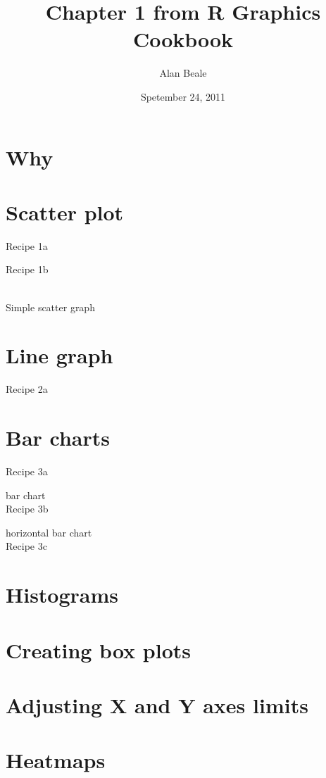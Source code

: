 \documentclass[10pt]{article}
\title{Chapter 1 from R Graphics Cookbook }
\author{Alan Beale}
\date{Spetember 24, 2011}
\newcommand{\placeRecipe}[1]{\bigskip \noindent  \bigskip}
\newcommand{\testRecipe}[1]{\begin{figure}[!htb] \centering  \end{figure}}
\begin{document}
\sffamily 
\maketitle

\section{Why}

\section{Scatter plot}
\Large{Recipe 1a}
\placeRecipe{recipe1a}

\Large{Recipe 1b}
\testRecipe{recipe1b}
\\Simple scatter graph 
\clearpage
\section{Line graph}
\Large{Recipe 2a}
\testRecipe{recipe2a} 
\clearpage
\section{ Bar charts}
\Large{Recipe 3a}
\testRecipe{recipe3a}
bar chart\\
\Large{Recipe 3b}
\testRecipe{recipe3b}
horizontal bar chart\\
\clearpage
\Large{Recipe 3c}
\testRecipe{recipe3c}
\placeRecipe{recipe3d}
\clearpage
\section{Histograms }
\testRecipe{recipe4a}

\testRecipe{recipe4b}
\testRecipe{recipe4c}

\section{Creating box plots}
\section{Adjusting X and Y axes limits}

\section{Heatmaps}
\testRecipe{baserecipe7a}
\testRecipe{ggRecipe7a}
\end{document}
